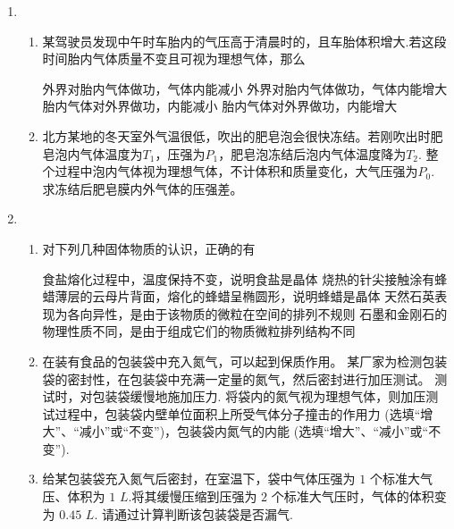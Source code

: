 \begin{enumerate}[leftmargin=0em]
\item 	
{}
\begin{enumerate}
\renewcommand{\labelenumi}{\arabic{enumi}.}
\item
某驾驶员发现中午时车胎内的气压高于清晨时的，且车胎体积增大.若这段时间胎内气体质量不变且可视为理想气体，那么  

\fourchoices
{外界对胎内气体做功，气体内能减小}
{外界对胎内气体做功，气体内能增大}
{胎内气体对外界做功，内能减小}
{胎内气体对外界做功，内能增大}



\item 
北方某地的冬天室外气温很低，吹出的肥皂泡会很快冻结。若刚吹出时肥皂泡内气体温度为$ T_{1} $，压强为$ P_{1} $，肥皂泡冻结后泡内气体温度降为$ T_{2} $. 整个过程中泡内气体视为理想气体，不计体积和质量变化，大气压强为$ P_{0} $. 求冻结后肥皂膜内外气体的压强差。






\end{enumerate}


\item 
{}
\begin{enumerate}
\renewcommand{\labelenumii}{(\arabic{enumii})}

\item 
对下列几种固体物质的认识，正确的有  


\fourchoices
{食盐熔化过程中，温度保持不变，说明食盐是晶体}
{烧热的针尖接触涂有蜂蜡薄层的云母片背面，熔化的蜂蜡呈椭圆形，说明蜂蜡是晶体}
{天然石英表现为各向异性，是由于该物质的微粒在空间的排列不规则}
{石墨和金刚石的物理性质不同，是由于组成它们的物质微粒排列结构不同}

\item 
在装有食品的包装袋中充入氮气，可以起到保质作用。 某厂家为检测包装袋的密封性，在包装袋中充满一定量的氮气，然后密封进行加压测试。 测试时，对包装袋缓慢地施加压力. 将袋内的氮气视为理想气体，则加压测试过程中，包装袋内壁单位面积上所受气体分子撞击的作用力  (选填“增大”、“减小”或“不变”)，包装袋内氮气的内能 (选填“增大”、“减小”或“不变”).

\item 
给某包装袋充入氮气后密封，在室温下，袋中气体压强为 $ 1 $ 个标准大气压、体积为 $ 1 $ $ L $.将其缓慢压缩到压强为 $ 2 $ 个标准大气压时，气体的体积变为 $ 0.45 $ $ L $. 请通过计算判断该包装袋是否漏气.


\end{enumerate}
\end{enumerate}
